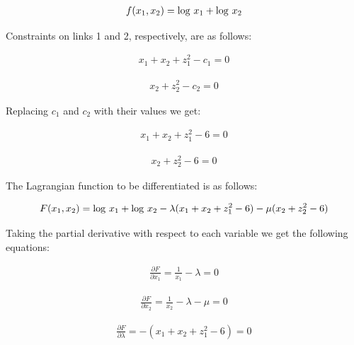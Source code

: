 \documentclass{article}
\def\pd#1#2{\frac{\partial#1}{\partial#2}}   %
\def\lg{{\rm log}}
\begin{document}
\begin{enumerate}
\begin{itemize}
\vspace{-3mm}

\begin{eqnarray*}
f(x_1, x_2) = \lg ~x_1 + \lg ~x_2
\end{eqnarray*}

\noindent Constraints on links 1 and 2, respectively, are as
follows:

\vspace{-5mm}

\begin{eqnarray*}
x_1 + x_2 + z_1^2 - c_1 = 0
\end{eqnarray*}

\vspace{-5mm}

\begin{eqnarray*}
x_2 + z_2^2 - c_2 = 0
\end{eqnarray*}


\noindent Replacing $c_1$ and $c_2$ with their values we get:

\vspace{-5mm}

\begin{eqnarray*}
x_1 + x_2 + z_1^2 - 6 = 0
\end{eqnarray*}

\vspace{-5mm}

\begin{eqnarray*}
x_2 + z_2^2 - 6 = 0
\end{eqnarray*}

\noindent The Lagrangian function to be differentiated is as
follows:

\vspace{-3mm}

\begin{eqnarray*}
F(x_1, x_2) = \lg ~x_1 + \lg ~x_2 - \lambda (x_1 + x_2 + z_1^2 -
6) - \mu(x_2 + z_2^2-6)
\end{eqnarray*}

\noindent Taking the partial derivative with respect to each
variable we get the following equations:

\begin{eqnarray*}
\pd{F}{x_1} = {\frac {1}{x_1}} - \lambda = 0
\end{eqnarray*}

\begin{eqnarray*}
\pd{F}{x_2} = {\frac {1}{x_2}} - \lambda - \mu = 0
\end{eqnarray*}

\begin{eqnarray*}
\pd{F}{\lambda} = -(x_1 + x_2 + z_1^2 - 6) = 0
\end{eqnarray*}


\end{itemize}
\end{enumerate}
\end{document}
